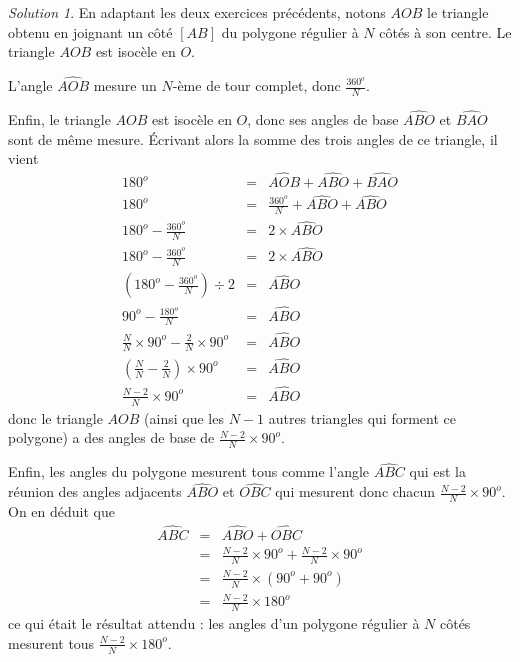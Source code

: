 \documentclass[14pt]{article}
\theoremstyle{remark}
\newtheorem*{sol}{Solution}
\newcounter{n}
\theoremstyle{plain}
\begin{document}
\begin{sol}
En adaptant les deux exercices précédents, notons $AOB$ le triangle obtenu en joignant un côté $[AB]$ du polygone régulier à $N$ côtés à son centre. Le triangle $AOB$ est isocèle en $O$. 

L'angle $\widehat{AOB}$ mesure un $N$-ème de tour complet, 
donc $\frac{360^o}N$. 

Enfin, le triangle $AOB$ est isocèle en $O$, donc ses angles de base $\widehat{ABO}$ et $\widehat{BAO}$ sont de même mesure. Écrivant alors la somme des trois angles de ce triangle, il vient 
\begin{eqnarray*} 180^o &=& \widehat{AOB} + \widehat{ABO} + \widehat{BAO} \\
180^o &=& \frac{360^o}N + \widehat{ABO} + \widehat{ABO} \\
180^o -\frac{360^o}N &=& 2\times \widehat{ABO}\\
180^o -\frac{360^o}N &=& 2\times \widehat{ABO}\\
\left(180^o -\frac{360^o}N\right)\div 2 &=& \widehat{ABO}\\
90^o- \frac{180^o}N&=& \widehat{ABO}\\
\frac{N}N\times90^o- \frac2N\times 90^o &=& \widehat{ABO}\\
\left(\frac{N}N-\frac2N\right)\times 90^o &=& \widehat{ABO}\\
\frac{N-2}N\times 90^o &=& \widehat{ABO}
\end{eqnarray*}
donc le triangle $AOB$ (ainsi que les $N-1$ autres triangles qui forment ce polygone) a des angles de base de $\frac{N-2}N\times 90^o$. 

Enfin, les angles du polygone mesurent tous comme l'angle
$\widehat{ABC}$ qui est la réunion des angles adjacents $\widehat{ABO}$ et $\widehat{OBC}$ qui mesurent donc chacun $\frac{N-2}N\times 90^o$. On en déduit que \begin{eqnarray*}
\widehat{ABC} &=& \widehat{ABO}+\widehat{OBC}\\
&=& \frac{N-2}N\times 90^o+\frac{N-2}N\times 90^o\\
&=&  \frac{N-2}N\times(90^o+90^o)\\
&=& \frac{N-2}N\times 180^o\end{eqnarray*}
 ce qui était le résultat attendu : les angles d'un polygone régulier à $N$ côtés mesurent tous $\frac{N-2}N\times 180^o$.


\end{sol}
\end{document}
